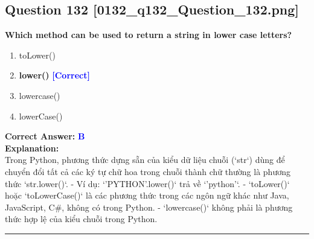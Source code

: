 \documentclass[11pt,a4paper]{article}
\begin{document}
\begin{minipage}{\textwidth}
\subsection*{Question 132 \quad \footnotesize{[0132_q132_Question_132.png]}}
\noindent \textbf{Which method can be used to return a string in lower case letters?}

\begin{enumerate}[label=\Alph*.]
    \item toLower()
    \item \textbf{lower()} \hfill \textcolor{blue}{\textbf{[Correct]}}
    \item lowercase()
    \item lowerCase()
\end{enumerate}

\noindent \textbf{Correct Answer:} \textcolor{blue}{\textbf{B}} \\[4pt]
\noindent \textbf{Explanation:}\\
Trong Python, phương thức dựng sẵn của kiểu dữ liệu chuỗi (`str`) dùng để chuyển đổi tất cả các ký tự chữ hoa trong chuỗi thành chữ thường là phương thức `str.lower()`.\newline
- Ví dụ: `'PYTHON'.lower()` trả về `'python'`.\newline
- `toLower()` hoặc `toLowerCase()` là các phương thức trong các ngôn ngữ khác như Java, JavaScript, C#, không có trong Python.\newline
- `lowercase()` không phải là phương thức hợp lệ của kiểu chuỗi trong Python.
\end{minipage}
\vspace{0.8cm}
\hrule
\vspace{0.5cm}
\end{document}
